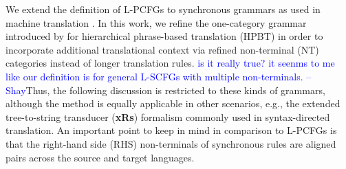 \documentclass[11pt]{article}
\newcommand{\shaycomment}[1]{\textcolor{blue}{#1 -- Shay}}
\begin{document}
We extend the definition of L-PCFGs \cite{Matsuzaki2005,Petrov2006} to synchronous grammars as used in machine translation \cite{Chiang2007}. 
In this work, we refine the one-category grammar introduced by  for hierarchical phrase-based translation (HPBT) in order to incorporate additional translational context via refined non-terminal (NT) categories instead of longer translation rules.  
\shaycomment{is it really true? it seenms to me like our definition is for general L-SCFGs with multiple non-terminals.}Thus, the following discussion is restricted to these kinds of grammars, although the method is equally applicable in other scenarios, e.g., the extended tree-to-string transducer ({\bf xRs}) formalism \cite{Huang2006,Graehl2008} commonly used in syntax-directed translation.  
An important point to keep in mind in comparison to L-PCFGs is that the right-hand side (RHS) non-terminals of synchronous rules are aligned pairs across the source and target languages.  
\end{document}
